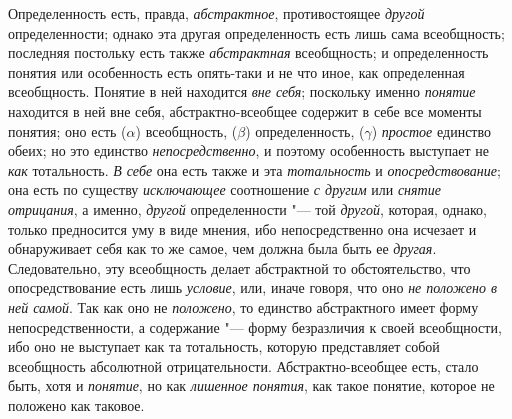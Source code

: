 {Определенность есть, правда,
{\em абстрактное},
противостоящее
{\em другой}
определенности; однако эта другая определенность есть лишь
сама всеобщность; последняя постольку есть также
{\em абстрактная}
всеобщность; и определенность понятия или особенность есть
опять-таки и не что иное, как определенная всеобщность. Понятие в ней
находится {\em вне себя};
поскольку именно
{\em понятие} находится в
ней вне себя, абстрактно-всеобщее содержит в себе все моменты понятия; оно
есть ($\alpha $) всеобщность, ($\beta $) определенность, ($\gamma $)
{\em простое} единство
обеих; но это единство
{\em непосредственно}, и
поэтому особенность выступает не
{\em как} тотальность.
{\em В себе} она есть
также и эта {\em тотальность}
и {\em опосредствование};
она есть по существу
{\em исключающее}
соотношение {\em с
другим} или {\em снятие
отрицания}, а именно,
{\em другой}
определенности "--- той
{\em другой}, которая,
однако, только предносится уму в виде мнения, ибо непосредственно она
исчезает и обнаруживает себя как то же самое, чем должна была быть ее
{\em другая}.
Следовательно, эту всеобщность делает абстрактной то
обстоятельство, что опосредствование есть лишь
{\em условие}, или, иначе
говоря, что оно {\em не положено в ней
самой}. Так как оно не
{\em положено}, то
единство абстрактного имеет форму непосредственности, а содержание
"--- форму безразличия к своей всеобщности, ибо оно не выступает
как та тотальность, которую представляет собой всеобщность абсолютной
отрицательности. Абстрактно-всеобщее есть, стало быть, хотя и
{\em понятие}, но как
{\em лишенное понятия},
как такое понятие, которое не положено как таковое.

}
